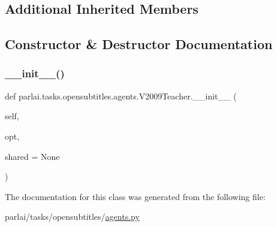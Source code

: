 \subsection*{Additional Inherited Members}


\subsection{Constructor \& Destructor Documentation}
\mbox{\label{classparlai_1_1tasks_1_1opensubtitles_1_1agents_1_1V2009Teacher_ad42d78a9d6ecfb02d6807452e3648fbe}} 
\subsubsection{\texorpdfstring{\+\_\+\+\_\+init\+\_\+\+\_\+()}{\_\_init\_\_()}}
{\footnotesize\ttfamily def parlai.\+tasks.\+opensubtitles.\+agents.\+V2009\+Teacher.\+\_\+\+\_\+init\+\_\+\+\_\+ (\begin{DoxyParamCaption}\item[{}]{self,  }\item[{}]{opt,  }\item[{}]{shared = {\ttfamily None} }\end{DoxyParamCaption})}



The documentation for this class was generated from the following file\+:\begin{DoxyCompactItemize}
\item 
parlai/tasks/opensubtitles/\hyperlink{parlai_2tasks_2opensubtitles_2agents_8py}{agents.\+py}\end{DoxyCompactItemize}
